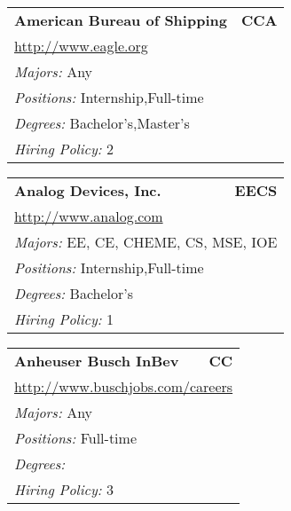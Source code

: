 \documentclass[twoside]{article}
\begin{document}
\begin{center}
\begin{multicols}{3}
\begin{FlushLeft}
\begin{minipage}{\columnwidth}
\end{minipage}
 
\begin{minipage}{\columnwidth}\begin{tabularx}{.95\columnwidth}{Xr}
                 {\Large\bf American Bureau of Shipping} & {\Large\bf CCA}\\
    \multicolumn{2}{p{.95\columnwidth}}{\url{http://www.eagle.org}}\\
    \multicolumn{2}{p{.95\columnwidth}}{\emph{Majors:} Any}\\
    \multicolumn{2}{p{.95\columnwidth}}{\emph{Positions:} Internship,Full-time}\\
    \multicolumn{2}{p{.95\columnwidth}}{\emph{Degrees:} Bachelor's,Master's}\\
    \multicolumn{2}{p{.95\columnwidth}}{\emph{Hiring Policy:} 2}\\
    \end{tabularx}
    
\end{minipage}
 
\begin{minipage}{\columnwidth}\begin{tabularx}{.95\columnwidth}{Xr}
                 {\Large\bf Analog Devices, Inc.} & {\Large\bf EECS}\\
    \multicolumn{2}{p{.95\columnwidth}}{\url{http://www.analog.com}}\\
    \multicolumn{2}{p{.95\columnwidth}}{\emph{Majors:} EE, CE, CHEME, CS, MSE, IOE}\\
    \multicolumn{2}{p{.95\columnwidth}}{\emph{Positions:} Internship,Full-time}\\
    \multicolumn{2}{p{.95\columnwidth}}{\emph{Degrees:} Bachelor's}\\
    \multicolumn{2}{p{.95\columnwidth}}{\emph{Hiring Policy:} 1}\\
    \end{tabularx}
    
\end{minipage}
 
\begin{minipage}{\columnwidth}\begin{tabularx}{.95\columnwidth}{Xr}
                 {\Large\bf Anheuser Busch InBev} & {\Large\bf CC}\\
    \multicolumn{2}{p{.95\columnwidth}}{\url{http://www.buschjobs.com/careers}}\\
    \multicolumn{2}{p{.95\columnwidth}}{\emph{Majors:} Any}\\
    \multicolumn{2}{p{.95\columnwidth}}{\emph{Positions:} Full-time}\\
    \multicolumn{2}{p{.95\columnwidth}}{\emph{Degrees:} }\\
    \multicolumn{2}{p{.95\columnwidth}}{\emph{Hiring Policy:} 3}\\
    \end{tabularx}
    

\end{minipage}
\end{FlushLeft}
\end{multicols}
\end{center}
\end{document}
